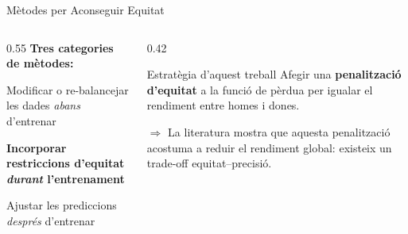 \documentclass[aspectratio=169,12pt]{beamer}
\begin{document}
\begin{frame}{Mètodes per Aconseguir Equitat}
  \begin{columns}[T]
    \begin{column}{0.55\textwidth}
      \textbf{Tres categories de mètodes:}
      \begin{description}
        \setlength\itemsep{0.7em}
        \item[\textbf{Pre-processing}] Modificar o re-balancejar les dades \emph{abans} d'entrenar
        \item[\textbf{In-processing}] \alert{\textbf{Incorporar restriccions d'equitat \emph{durant} l'entrenament}}
        \item[\textbf{Post-processing}] Ajustar les prediccions \emph{després} d'entrenar
      \end{description}
    \end{column}
    \begin{column}{0.42\textwidth}
      \begin{exampleblock}{Estratègia d'aquest treball}
        Afegir una \textbf{penalització d'equitat} a la funció de pèrdua per igualar el rendiment entre homes i dones.
      \end{exampleblock}
      \vspace{0.4em}
      {\small $\Rightarrow$ La literatura mostra que aquesta penalització acostuma a reduir el rendiment global: existeix un \alert{trade-off} equitat–precisió.}
    \end{column}
  \end{columns}
\end{frame}
\end{document}
